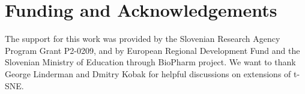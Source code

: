 \documentclass{bioinfo}
\begin{document}
\vspace{-6mm}
\section*{Funding and Acknowledgements}
The support for this work was provided by the Slovenian Research Agency Program
Grant P2-0209, and by European Regional Development Fund and the Slovenian
Ministry of Education through BioPharm project. We want to thank George
Linderman and Dmitry Kobak for helpful discussions on extensions of t-SNE.

\vspace{-6mm}



\end{document}
